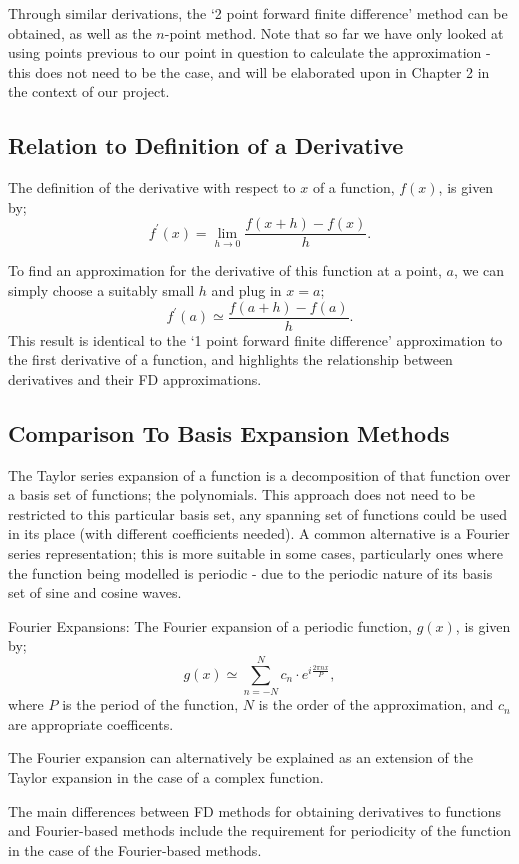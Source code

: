 Through similar derivations, the `2 point forward finite difference' method can be obtained, as well as the $n$-point method. Note that so far we have only looked at using points previous to our point in question to calculate the approximation - this does not need to be the case, and will be elaborated upon in Chapter 2 in the context of our project.

\subsection{Relation to Definition of a Derivative}
The definition of the derivative with respect to $x$ of a function, $f\left(x\right)$, is given by;
$$
f^{\prime}(x)=\lim _{h \rightarrow 0} \frac{f(x+h)-f(x)}{h}.
$$

To find an approximation for the derivative of this function at a point, $a$, we can simply choose a suitably small $h$ and plug in $x=a$;
$$
f^{\prime}(a) \simeq \frac{f(a+h)-f(a)}{h}.
$$
This result is identical to the `1 point forward finite difference' approximation to the first derivative of a function, and highlights the relationship between derivatives and their FD approximations.

\subsection{Comparison To Basis Expansion Methods}
The Taylor series expansion of a function is a decomposition of that function over a basis set of functions; the polynomials. This approach does not need to be restricted to this particular basis set, any spanning set of functions could be used in its place (with different coefficients needed). A common alternative is a Fourier series representation; this is more suitable in some cases, particularly ones where the function being modelled is periodic - due to the periodic nature of its basis set of sine and cosine waves.


Fourier Expansions:
The Fourier expansion of a periodic function, $g(x)$, is given by;
$$
g(x) \simeq \sum_{n=-N}^{N} c_{n} \cdot e^{i \frac{2 \pi n x}{P}},
$$
where $P$ is the period of the function, $N$ is the order of the approximation, and $c_{n}$ are appropriate coefficents.

The Fourier expansion can alternatively be explained as an extension of the Taylor expansion in the case of a complex function.

The main differences between FD methods for obtaining derivatives to functions and Fourier-based methods include the requirement for periodicity of the function in the case of the Fourier-based methods.

